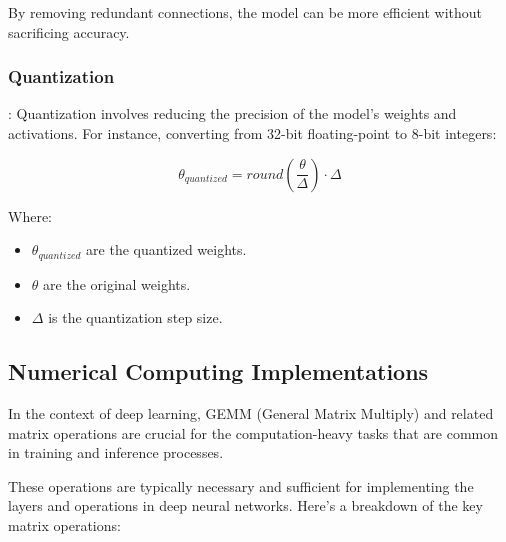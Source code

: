 \documentclass{article}
\begin{document}
By removing redundant connections, the model can be more efficient without sacrificing accuracy.

\subsubsection{Quantization}: Quantization involves reducing the precision of the model's weights and activations. For instance, converting from 32-bit floating-point to 8-bit integers:

\[ \theta_{quantized} = \textit{round}\left(\frac{\theta}{\Delta}\right) \cdot \Delta \]

Where:
\begin{itemize}
    \item \( \theta_{quantized} \) are the quantized weights.
    \item \( \theta \) are the original weights.
    \item \( \Delta \) is the quantization step size.
\end{itemize}

\subsection{Numerical Computing Implementations}

In the context of deep learning, GEMM (General Matrix Multiply) and related matrix operations are crucial for the computation-heavy tasks that are common in training and inference processes. 

These operations are typically necessary and sufficient for implementing the layers and operations in deep neural networks. Here's a breakdown of the key matrix operations:
\end{document}
